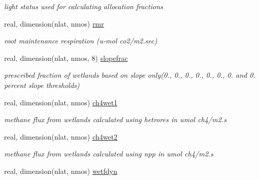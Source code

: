 \begin{DoxyCompactItemize}
\begin{DoxyCompactList}\small\item\em light status used for calculating allocation fractions \end{DoxyCompactList}\item 
\hypertarget{structctem__statevars_1_1veg__rot_aa1c1151a260bfce041ab912a65bf43a3}{}real, dimension(nlat, nmos) \hyperlink{structctem__statevars_1_1veg__rot_aa1c1151a260bfce041ab912a65bf43a3}{rmr}\label{structctem__statevars_1_1veg__rot_aa1c1151a260bfce041ab912a65bf43a3}

\begin{DoxyCompactList}\small\item\em root maintenance respiration (u-\/mol co2/m2.\+sec) \end{DoxyCompactList}\item 
\hypertarget{structctem__statevars_1_1veg__rot_a412b87b7cd443a66e6fe38a18d7dd95d}{}real, dimension(nlat, nmos, 8) \hyperlink{structctem__statevars_1_1veg__rot_a412b87b7cd443a66e6fe38a18d7dd95d}{slopefrac}\label{structctem__statevars_1_1veg__rot_a412b87b7cd443a66e6fe38a18d7dd95d}

\begin{DoxyCompactList}\small\item\em prescribed fraction of wetlands based on slope only(0., 0., 0., 0., 0., 0., 0. and 0. percent slope thresholds) \end{DoxyCompactList}\item 
\hypertarget{structctem__statevars_1_1veg__rot_a69c5577765832025effcb3e169f7aa79}{}real, dimension(nlat, nmos) \hyperlink{structctem__statevars_1_1veg__rot_a69c5577765832025effcb3e169f7aa79}{ch4wet1}\label{structctem__statevars_1_1veg__rot_a69c5577765832025effcb3e169f7aa79}

\begin{DoxyCompactList}\small\item\em methane flux from wetlands calculated using hetrores in umol ch4/m2.\+s \end{DoxyCompactList}\item 
\hypertarget{structctem__statevars_1_1veg__rot_a6e9fcba0e2089c4c939b474ddf9941d2}{}real, dimension(nlat, nmos) \hyperlink{structctem__statevars_1_1veg__rot_a6e9fcba0e2089c4c939b474ddf9941d2}{ch4wet2}\label{structctem__statevars_1_1veg__rot_a6e9fcba0e2089c4c939b474ddf9941d2}

\begin{DoxyCompactList}\small\item\em methane flux from wetlands calculated using npp in umol ch4/m2.\+s \end{DoxyCompactList}\item 
\hypertarget{structctem__statevars_1_1veg__rot_a9865345950581197a2069c5b6ed0af76}{}real, dimension(nlat, nmos) \hyperlink{structctem__statevars_1_1veg__rot_a9865345950581197a2069c5b6ed0af76}{wetfdyn}\label{structctem__statevars_1_1veg__rot_a9865345950581197a2069c5b6ed0af76}


\end{DoxyCompactItemize}
